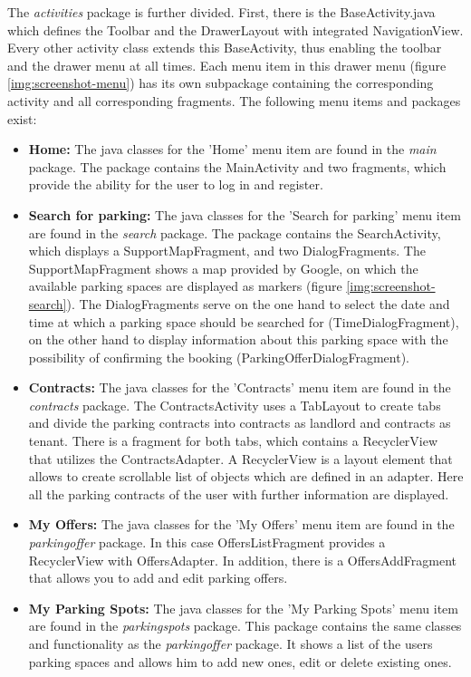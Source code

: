 The \textit{activities} package is further divided. First, there is the BaseActivity.java which defines the Toolbar and the DrawerLayout with integrated NavigationView. Every other activity class extends this BaseActivity, thus enabling the toolbar and the drawer menu at all times. Each menu item in this drawer menu (figure \ref{img:screenshot-menu}) has its own subpackage containing the corresponding activity and all corresponding fragments. The following menu items and packages exist:

\begin{itemize}
\item \textbf{Home:} The java classes for the 'Home' menu item are found in the \textit{main} package. The package contains the MainActivity and two fragments, which provide the ability for the user to log in and register.
\item \textbf{Search for parking:} The java classes for the 'Search for parking' menu item are found in the \textit{search} package. The package contains the SearchActivity, which displays a SupportMapFragment, and two DialogFragments. The SupportMapFragment shows a map provided by Google, on which the available parking spaces are displayed as markers (figure \ref{img:screenshot-search}). The DialogFragments serve on the one hand to select the date and time at which a parking space should be searched for (TimeDialogFragment), on the other hand to display information about this parking space with the possibility of confirming the booking (ParkingOfferDialogFragment).
\item \textbf{Contracts:} The java classes for the 'Contracts' menu item are found in the \textit{contracts} package. The ContractsActivity uses a TabLayout to create tabs and divide the parking contracts into contracts as landlord and contracts as tenant. There is a fragment for both tabs, which contains a RecyclerView that utilizes the ContractsAdapter. A RecyclerView is a layout element that allows to create scrollable list of objects which are defined in an adapter. Here all the parking contracts of the user with further information are displayed.
\item \textbf{My Offers:} The java classes for the 'My Offers' menu item are found in the \textit{parkingoffer} package. In this case OffersListFragment provides a RecyclerView with OffersAdapter. In addition, there is a OffersAddFragment that allows you to add and edit parking offers.
\item \textbf{My Parking Spots:} The java classes for the 'My Parking Spots' menu item are found in the \textit{parkingspots} package. This package contains the same classes and functionality as the \textit{parkingoffer} package. It shows a list of the users parking spaces and allows him to add new ones, edit or delete existing ones.

\end{itemize}
